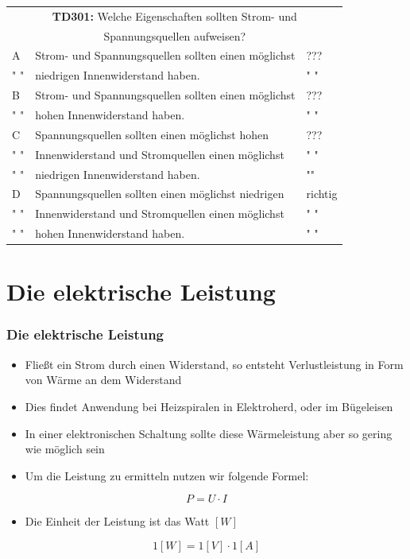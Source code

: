 \begin{frame}
	\begin{small}	
	\begin{tabular}{|l|l|l|}
	\hline
		\multicolumn{3}{|c|}{\textbf{TD301:} Welche Eigenschaften sollten Strom- und}\\
		\multicolumn{3}{|c|}{Spannungsquellen aufweisen?}\\
		\hline
		A &  Strom- und Spannungsquellen sollten einen möglichst  & ??? \\
		" " & niedrigen Innenwiderstand haben. & " "\\ \hline
		B &  Strom- und Spannungsquellen sollten einen möglichst  & ??? \\
		" " & hohen Innenwiderstand haben. & " "\\ \hline
		C & Spannungsquellen sollten einen möglichst hohen & ??? \\
		" " & Innenwiderstand und Stromquellen einen möglichst  & " " \\ 
		" " & niedrigen Innenwiderstand haben.  & "" \\ \hline
		D & Spannungsquellen sollten einen möglichst niedrigen & richtig \\
		" " & Innenwiderstand und Stromquellen einen möglichst & " " \\ 
		" " & hohen Innenwiderstand haben.  & " " \\ \hline 		
	\end{tabular}
	\end{small}
\end{frame}

\section{Die elektrische Leistung}
\begin{frame}
	\frametitle{Die elektrische Leistung}
	\begin{itemize}
		\item	Fließt ein Strom durch einen Widerstand, so entsteht Verlustleistung in Form von Wärme an dem Widerstand
		\item	Dies findet Anwendung bei Heizspiralen in Elektroherd, oder im Bügeleisen
		\item	In einer elektronischen Schaltung sollte diese Wärmeleistung aber so gering wie möglich sein
		\item	Um die Leistung zu ermitteln nutzen wir folgende Formel:
	\end{itemize}
	\begin{equation}
		P = U \cdot I
	\end{equation}
	\begin{itemize}
		\item	Die Einheit der Leistung ist das Watt $[W]$
	\end{itemize}
	\begin{equation}
		 1[W] = 1[V] \cdot 1[A]
	\end{equation}
\end{frame}

